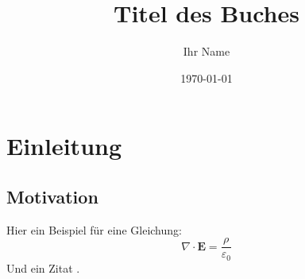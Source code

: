 \documentclass[11pt, a4paper, twoside, openright]{book}
\theoremstyle{definition}
\theoremstyle{plain}
\theoremstyle{remark}
\begin{document}
\frontmatter
\title{Titel des Buches}
\author{Ihr Name}
\date{\today}
\maketitle

\tableofcontents

\mainmatter
\chapter{Einleitung}
\section{Motivation}
Hier ein Beispiel für eine Gleichung:
\begin{equation}
    \nabla \cdot \bm{E} = \frac{\rho}{\varepsilon_0}
\end{equation}
Und ein Zitat \parencite{einstein1915}.

\backmatter
\printbibliography[title=Literaturverzeichnis]
\printglossaries
\end{document}
